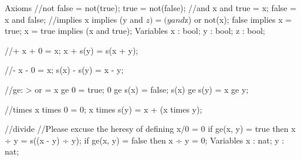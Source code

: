 \begin{filecontents*}

Axioms
//not
	false = not(true);
 	true = not(false);
   //and
 	x and true = x;
 	false = x and false;
   //implies
 	x implies (y and $z) = (y and $z) or not(x);
 	false implies x = true;
 	x = true implies (x and true);
    Variables   x : bool;   y : bool;   z : bool;


   //+
 	x + 0 = x;
 	x + s(y) = s(x + y);


   //-
	x - 0 = x;
	s(x) - s(y) = x - y;


   //ge: > or =
	x ge 0 = true;
	0 ge s(x) = false;
	s(x) ge s(y) = x ge y;


   //times
	x times 0 = 0;
	x times s(y) = x + (x times y);


   //divide
   //Please excuse the heresy of defining x/0 = 0
	if ge(x, y) = true then x ÷ y = s((x - y) ÷ y);
	if ge(x, y) = false then x ÷ y = 0;
Variables	x : nat; 	y : nat;
\end{filecontents*}


